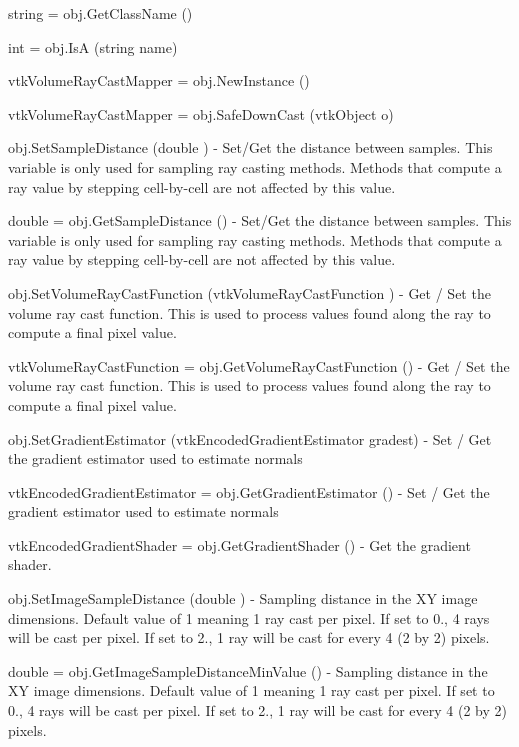 \begin{DoxyItemize}
\item {\ttfamily string = obj.\-Get\-Class\-Name ()}  
\item {\ttfamily int = obj.\-Is\-A (string name)}  
\item {\ttfamily vtk\-Volume\-Ray\-Cast\-Mapper = obj.\-New\-Instance ()}  
\item {\ttfamily vtk\-Volume\-Ray\-Cast\-Mapper = obj.\-Safe\-Down\-Cast (vtk\-Object o)}  
\item {\ttfamily obj.\-Set\-Sample\-Distance (double )} -\/ Set/\-Get the distance between samples. This variable is only used for sampling ray casting methods. Methods that compute a ray value by stepping cell-\/by-\/cell are not affected by this value.  
\item {\ttfamily double = obj.\-Get\-Sample\-Distance ()} -\/ Set/\-Get the distance between samples. This variable is only used for sampling ray casting methods. Methods that compute a ray value by stepping cell-\/by-\/cell are not affected by this value.  
\item {\ttfamily obj.\-Set\-Volume\-Ray\-Cast\-Function (vtk\-Volume\-Ray\-Cast\-Function )} -\/ Get / Set the volume ray cast function. This is used to process values found along the ray to compute a final pixel value.  
\item {\ttfamily vtk\-Volume\-Ray\-Cast\-Function = obj.\-Get\-Volume\-Ray\-Cast\-Function ()} -\/ Get / Set the volume ray cast function. This is used to process values found along the ray to compute a final pixel value.  
\item {\ttfamily obj.\-Set\-Gradient\-Estimator (vtk\-Encoded\-Gradient\-Estimator gradest)} -\/ Set / Get the gradient estimator used to estimate normals  
\item {\ttfamily vtk\-Encoded\-Gradient\-Estimator = obj.\-Get\-Gradient\-Estimator ()} -\/ Set / Get the gradient estimator used to estimate normals  
\item {\ttfamily vtk\-Encoded\-Gradient\-Shader = obj.\-Get\-Gradient\-Shader ()} -\/ Get the gradient shader.  
\item {\ttfamily obj.\-Set\-Image\-Sample\-Distance (double )} -\/ Sampling distance in the X\-Y image dimensions. Default value of 1 meaning 1 ray cast per pixel. If set to 0., 4 rays will be cast per pixel. If set to 2., 1 ray will be cast for every 4 (2 by 2) pixels.  
\item {\ttfamily double = obj.\-Get\-Image\-Sample\-Distance\-Min\-Value ()} -\/ Sampling distance in the X\-Y image dimensions. Default value of 1 meaning 1 ray cast per pixel. If set to 0., 4 rays will be cast per pixel. If set to 2., 1 ray will be cast for every 4 (2 by 2) pixels.  

\end{DoxyItemize}
